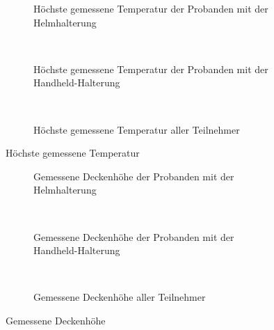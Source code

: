 \begin{figure}[H]
	\centering
	\begin{subfigure}[t]{0.3\textwidth}
		\centering
		\caption{Höchste gemessene Temperatur der Probanden mit der Helmhalterung}
		\label{fig:study2_head_heat}
	\end{subfigure}
	~
	\begin{subfigure}[t]{0.3\textwidth}
		\centering
		\caption{Höchste gemessene Temperatur der Probanden mit der Handheld-Halterung}
		\label{fig:study2_hand_heat}
	\end{subfigure}
	~
	\begin{subfigure}[t]{0.3\textwidth}
		\centering
		\caption{Höchste gemessene Temperatur aller Teilnehmer}
		\label{fig:study2_both_heat}
	\end{subfigure}
	\caption{Höchste gemessene Temperatur}
	\label{fig:study2_heat}
\end{figure}

\begin{figure}[H]
	\centering
	\begin{subfigure}[t]{0.3\textwidth}
		\centering
		\caption{Gemessene Deckenhöhe der Probanden mit der Helmhalterung}
		\label{fig:study2_head_height}
	\end{subfigure}
	~
	\begin{subfigure}[t]{0.3\textwidth}
		\centering
		\caption{Gemessene Deckenhöhe der Probanden mit der Handheld-Halterung}
		\label{fig:study2_hand_height}
	\end{subfigure}
	~
	\begin{subfigure}[t]{0.3\textwidth}
		\centering
		\caption{Gemessene Deckenhöhe aller Teilnehmer}
		\label{fig:study2_both_height}
	\end{subfigure}
	\caption{Gemessene Deckenhöhe}
	\label{fig:study2_height}
\end{figure}

